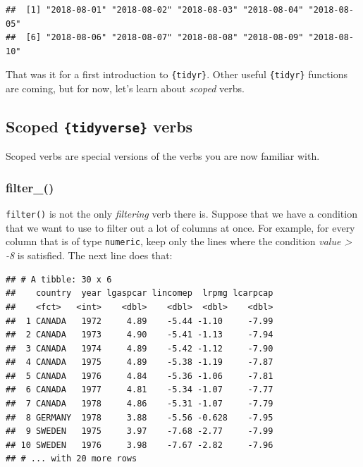 \documentclass[]{gitbook}
\newenvironment{Shaded}{\begin{snugshade}}{\end{snugshade}}
\newcommand{\DecValTok}[1]{\textcolor[rgb]{0.00,0.00,0.81}{#1}}
\newcommand{\KeywordTok}[1]{\textcolor[rgb]{0.13,0.29,0.53}{\textbf{#1}}}
\newcommand{\NormalTok}[1]{#1}
\newcommand{\OperatorTok}[1]{\textcolor[rgb]{0.81,0.36,0.00}{\textbf{#1}}}
\newcommand{\StringTok}[1]{\textcolor[rgb]{0.31,0.60,0.02}{#1}}
\theoremstyle{definition}
\theoremstyle{definition}
\theoremstyle{definition}
\theoremstyle{remark}
\begin{document}
\begin{verbatim}
##  [1] "2018-08-01" "2018-08-02" "2018-08-03" "2018-08-04" "2018-08-05"
##  [6] "2018-08-06" "2018-08-07" "2018-08-08" "2018-08-09" "2018-08-10"
\end{verbatim}

That was it for a first introduction to \texttt{\{tidyr\}}. Other useful
\texttt{\{tidyr\}} functions are coming, but for now, let's learn about
\emph{scoped} verbs.

\hypertarget{scoped-tidyverse-verbs}{%
\subsection{\texorpdfstring{Scoped \texttt{\{tidyverse\}}
verbs}{Scoped \{tidyverse\} verbs}}\label{scoped-tidyverse-verbs}}

Scoped verbs are special versions of the verbs you are now familiar
with.

\hypertarget{filter_}{%
\subsubsection{filter\_()}\label{filter_}}

\texttt{filter()} is not the only \emph{filtering} verb there is.
Suppose that we have a condition that we want to use to filter out a lot
of columns at once. For example, for every column that is of type
\texttt{numeric}, keep only the lines where the condition \emph{value
\textgreater{} -8} is satisfied. The next line does that:

\begin{Shaded}
\end{Shaded}

\begin{verbatim}
## # A tibble: 30 x 6
##    country  year lgaspcar lincomep  lrpmg lcarpcap
##    <fct>   <int>    <dbl>    <dbl>  <dbl>    <dbl>
##  1 CANADA   1972     4.89    -5.44 -1.10     -7.99
##  2 CANADA   1973     4.90    -5.41 -1.13     -7.94
##  3 CANADA   1974     4.89    -5.42 -1.12     -7.90
##  4 CANADA   1975     4.89    -5.38 -1.19     -7.87
##  5 CANADA   1976     4.84    -5.36 -1.06     -7.81
##  6 CANADA   1977     4.81    -5.34 -1.07     -7.77
##  7 CANADA   1978     4.86    -5.31 -1.07     -7.79
##  8 GERMANY  1978     3.88    -5.56 -0.628    -7.95
##  9 SWEDEN   1975     3.97    -7.68 -2.77     -7.99
## 10 SWEDEN   1976     3.98    -7.67 -2.82     -7.96
## # ... with 20 more rows
\end{verbatim}
\end{document}
